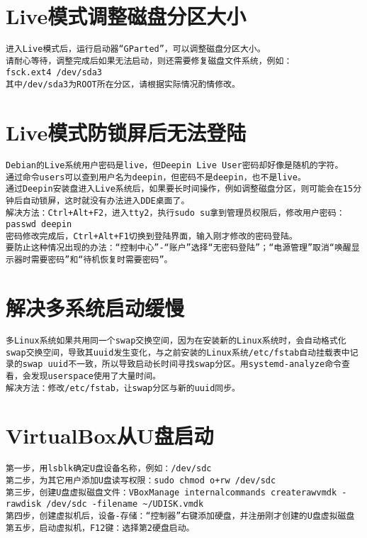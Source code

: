 \documentclass[a4paper,fontset=fandol,zihao=-4,linespread=1.2]{ctexbook}
\begin{document}
\section{Live模式调整磁盘分区大小}
\begin{lstlisting}
进入Live模式后，运行启动器“GParted”，可以调整磁盘分区大小。
请耐心等待，调整完成后如果无法启动，则还需要修复磁盘文件系统，例如：
fsck.ext4 /dev/sda3
其中/dev/sda3为ROOT所在分区，请根据实际情况酌情修改。
\end{lstlisting}

\section{Live模式防锁屏后无法登陆}
\begin{lstlisting}
Debian的Live系统用户密码是live，但Deepin Live User密码却好像是随机的字符。
通过命令users可以查到用户名为deepin，但密码不是deepin，也不是live。
通过Deepin安装盘进入Live系统后，如果要长时间操作，例如调整磁盘分区，则可能会在15分钟后自动锁屏，这时就没有办法进入DDE桌面了。
解决方法：Ctrl+Alt+F2，进入tty2，执行sudo su拿到管理员权限后，修改用户密码：
passwd deepin
密码修改完成后，Ctrl+Alt+F1切换到登陆界面，输入刚才修改的密码登陆。
要防止这种情况出现的办法：“控制中心”-“账户”选择“无密码登陆”；“电源管理”取消“唤醒显示器时需要密码”和“待机恢复时需要密码”。
\end{lstlisting}

\section{解决多系统启动缓慢}
\begin{lstlisting}
多Linux系统如果共用同一个swap交换空间，因为在安装新的Linux系统时，会自动格式化swap交换空间，导致其uuid发生变化，与之前安装的Linux系统/etc/fstab自动挂载表中记录的swap uuid不一致，所以导致启动长时间寻找swap分区。用systemd-analyze命令查看，会发现userspace使用了大量时间。
解决方法：修改/etc/fstab，让swap分区与新的uuid同步。
\end{lstlisting}

\section{VirtualBox从U盘启动}
\begin{lstlisting}
第一步，用lsblk确定U盘设备名称，例如：/dev/sdc
第二步，为其它用户添加U盘读写权限：sudo chmod o+rw /dev/sdc
第三步，创建U盘虚拟磁盘文件：VBoxManage internalcommands createrawvmdk -rawdisk /dev/sdc -filename ~/UDISK.vmdk
第四步，创建虚拟机后，设备-存储：“控制器”右键添加硬盘，并注册刚才创建的U盘虚拟磁盘
第五步，启动虚拟机，F12键：选择第2硬盘启动。
\end{lstlisting}
\end{document}
